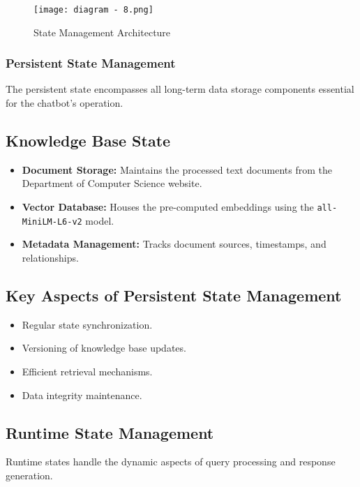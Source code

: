 \documentclass[12pt,a4paper]{report}
\begin{document}
\begin{figure}[htbp]
    \centering
    \texttt{[image: diagram - 8.png]}
    \caption{State Management Architecture}
    \label{fig:development-environment}
\end{figure}

\subsubsection{Persistent State Management}
The persistent state encompasses all long-term data storage components essential for the chatbot's operation.

\subsection{Knowledge Base State}
\begin{itemize}
    \item \textbf{Document Storage:} Maintains the processed text documents from the Department of Computer Science website.
    \item \textbf{Vector Database:} Houses the pre-computed embeddings using the \texttt{all-MiniLM-L6-v2} model.
    \item \textbf{Metadata Management:} Tracks document sources, timestamps, and relationships.
\end{itemize}

\subsection{Key Aspects of Persistent State Management}
\begin{itemize}
    \item Regular state synchronization.
    \item Versioning of knowledge base updates.
    \item Efficient retrieval mechanisms.
    \item Data integrity maintenance.
\end{itemize}

\subsection{Runtime State Management}
Runtime states handle the dynamic aspects of query processing and response generation.
\end{document}
